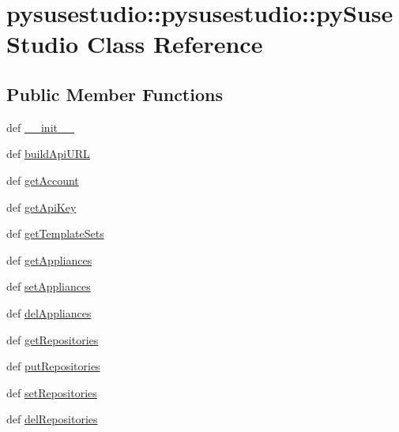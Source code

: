 \hypertarget{classpysusestudio_1_1pysusestudio_1_1py_suse_studio}{
\section{pysusestudio::pysusestudio::pySuseStudio Class Reference}
\label{classpysusestudio_1_1pysusestudio_1_1py_suse_studio}
}
\subsection*{Public Member Functions}
\begin{DoxyCompactItemize}
\item 
def \hyperlink{classpysusestudio_1_1pysusestudio_1_1py_suse_studio_a21298bd7976506411c13c37287c939a4}{\_\-\_\-init\_\-\_\-}
\item 
def \hyperlink{classpysusestudio_1_1pysusestudio_1_1py_suse_studio_ac4edfb6464e00e862c286e666a475d1e}{buildApiURL}
\item 
def \hyperlink{classpysusestudio_1_1pysusestudio_1_1py_suse_studio_a1ce6fe70260b86b16a349c173f15bc88}{getAccount}
\item 
def \hyperlink{classpysusestudio_1_1pysusestudio_1_1py_suse_studio_a5f363a90b6b61d627d14a6f350a32889}{getApiKey}
\item 
def \hyperlink{classpysusestudio_1_1pysusestudio_1_1py_suse_studio_af1df8da11a13134ea8db3424abf07007}{getTemplateSets}
\item 
def \hyperlink{classpysusestudio_1_1pysusestudio_1_1py_suse_studio_a2ef486ee95ee6badd938d3a89f33a985}{getAppliances}
\item 
def \hyperlink{classpysusestudio_1_1pysusestudio_1_1py_suse_studio_ab0ec1c2ad2ca5c1659c219b131b42248}{setAppliances}
\item 
def \hyperlink{classpysusestudio_1_1pysusestudio_1_1py_suse_studio_a86def4a320f9963627271b4b573bba02}{delAppliances}
\item 
def \hyperlink{classpysusestudio_1_1pysusestudio_1_1py_suse_studio_a01ef6840873e9224e3afa658d1454108}{getRepositories}
\item 
def \hyperlink{classpysusestudio_1_1pysusestudio_1_1py_suse_studio_aefd1c29da651aea6fc377a9af04c9e6f}{putRepositories}
\item 
def \hyperlink{classpysusestudio_1_1pysusestudio_1_1py_suse_studio_a3cd33281e07ef979257a943307365dd9}{setRepositories}
\item 
def \hyperlink{classpysusestudio_1_1pysusestudio_1_1py_suse_studio_aca14bff0d5452a09dcd1b75a534eea76}{delRepositories}

\end{DoxyCompactItemize}
